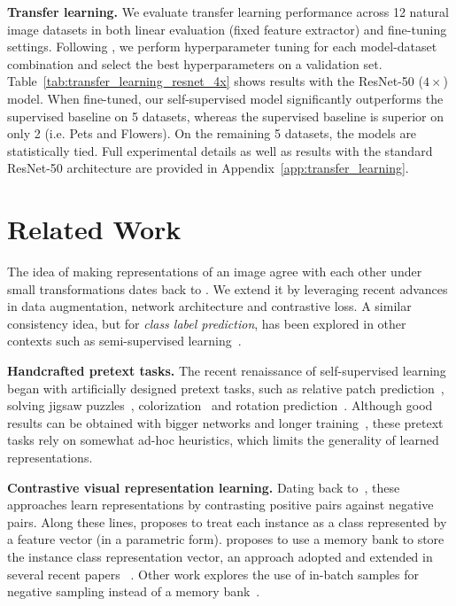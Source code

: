 \documentclass{article}
\begin{document}
\textbf{Transfer learning.} We evaluate transfer learning performance across 12 natural image datasets in both linear evaluation (fixed feature extractor) and fine-tuning settings. Following \citet{kornblith2019better}, we perform hyperparameter tuning for each model-dataset combination and select the best hyperparameters on a validation set. Table~\ref{tab:transfer_learning_resnet_4x} shows results with the ResNet-50 ($4\times$) model.  When fine-tuned, our self-supervised model significantly outperforms the supervised baseline on 5 datasets, whereas the supervised baseline is superior on only 2 (i.e. Pets and Flowers). On the remaining 5 datasets, the models are statistically tied. 
Full experimental details as well as results with the standard ResNet-50 architecture are provided in Appendix~\ref{app:transfer_learning}. \section{Related Work}
\label{sec:related}

The idea of making representations of an image agree with each other under small transformations dates back to \citet{becker1992self}. We extend it by leveraging recent advances in data augmentation, network architecture and contrastive loss. A similar consistency idea, but for \textit{class label prediction}, has been explored in other contexts such as semi-supervised learning~\cite{xie2019unsupervised,berthelot2019mixmatch}.

\textbf{Handcrafted pretext tasks.} The recent renaissance of self-supervised learning began with artificially designed pretext tasks, such as relative patch prediction~\cite{doersch2015unsupervised}, solving jigsaw puzzles~\cite{noroozi2016unsupervised}, colorization~\cite{zhang2016colorful} and rotation prediction~\cite{gidaris2018unsupervised,chen2019self}. Although good results can be obtained with bigger networks and longer training~\cite{kolesnikov2019revisiting}, these pretext tasks rely on somewhat ad-hoc heuristics, which limits the generality of learned representations.

\textbf{Contrastive visual representation learning.} Dating back to~\citet{hadsell2006dimensionality}, these approaches learn representations by contrasting positive pairs against negative pairs. Along these lines, \citet{dosovitskiy2014discriminative} proposes to treat each instance as a class represented by a feature vector (in a parametric form). \citet{wu2018unsupervised} proposes to use a memory bank to store the instance class representation vector, an approach adopted and extended in several recent papers ~\cite{zhuang2019local,tian2019contrastive,he2019momentum,misra2019self}. Other work explores the use of in-batch samples for negative sampling instead of a memory bank~\cite{doersch2017multi,ye2019unsupervised,ji2019invariant}.
\end{document}
